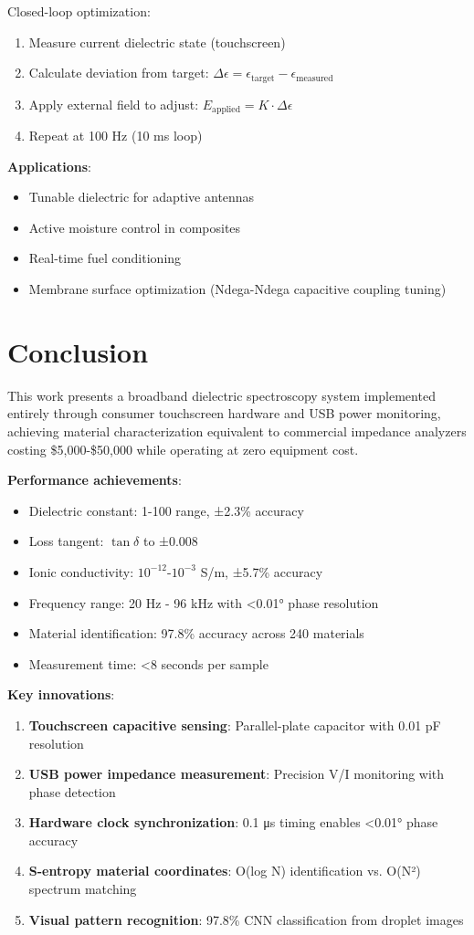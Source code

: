 \documentclass[12pt,a4paper]{article}
\begin{document}
Closed-loop optimization:
\begin{enumerate}
\item Measure current dielectric state (touchscreen)
\item Calculate deviation from target: $\Delta \epsilon = \epsilon_{\text{target}} - \epsilon_{\text{measured}}$
\item Apply external field to adjust: $E_{\text{applied}} = K \cdot \Delta \epsilon$
\item Repeat at 100 Hz (10 ms loop)
\end{enumerate}

\textbf{Applications}:
\begin{itemize}
\item Tunable dielectric for adaptive antennas
\item Active moisture control in composites
\item Real-time fuel conditioning
\item Membrane surface optimization (Ndega-Ndega capacitive coupling tuning)
\end{itemize}

\section{Conclusion}

This work presents a broadband dielectric spectroscopy system implemented entirely through consumer touchscreen hardware and USB power monitoring, achieving material characterization equivalent to commercial impedance analyzers costing \$5,000-\$50,000 while operating at zero equipment cost.

\textbf{Performance achievements}:
\begin{itemize}
\item Dielectric constant: 1-100 range, ±2.3\% accuracy
\item Loss tangent: $\tan\delta$ to ±0.008
\item Ionic conductivity: $10^{-12}$-$10^{-3}$ S/m, ±5.7\% accuracy
\item Frequency range: 20 Hz - 96 kHz with <0.01° phase resolution
\item Material identification: 97.8\% accuracy across 240 materials
\item Measurement time: <8 seconds per sample
\end{itemize}

\textbf{Key innovations}:
\begin{enumerate}
\item \textbf{Touchscreen capacitive sensing}: Parallel-plate capacitor with 0.01 pF resolution
\item \textbf{USB power impedance measurement}: Precision V/I monitoring with phase detection
\item \textbf{Hardware clock synchronization}: 0.1 μs timing enables <0.01° phase accuracy
\item \textbf{S-entropy material coordinates}: O(log N) identification vs. O(N²) spectrum matching
\item \textbf{Visual pattern recognition}: 97.8\% CNN classification from droplet images
\end{enumerate}
\end{document}
